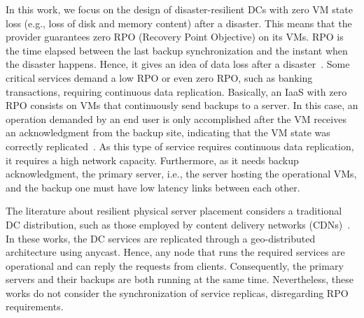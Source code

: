 \documentclass[preprint]{elsarticle}
\begin{document}
In this work, we focus on the design of disaster-resilient DCs with zero VM state loss (e.g., loss of disk and memory content) after a disaster. This means that the provider guarantees zero RPO (Recovery Point Objective) on its VMs. RPO is the time elapsed between the last backup synchronization and the instant when the disaster happens. Hence, it gives an idea of data loss after a disaster~\cite{couto2014Network}. Some critical services demand a low RPO or even zero RPO, such as banking transactions, requiring continuous data replication. 
Basically, an IaaS with zero RPO consists on VMs that continuously send backups to a server. In this case, an operation demanded by an end user is only accomplished after the VM receives an acknowledgment from the backup site, indicating that the VM state was correctly replicated~\cite{rajagopalan2012secondsite}.
As this type of service requires continuous data replication, it requires a high network capacity. Furthermore, as it needs backup acknowledgment, the primary server, i.e., the server hosting the operational VMs, and the backup one must have low latency links between each other.

The literature about resilient physical server placement considers a traditional DC distribution, such as those employed by content delivery networks (CDNs)~\cite{habib2012design,xiaoJoint2014}. In these works, the DC services are replicated through a geo-distributed architecture using anycast.
Hence, any node that runs the required services are operational and can reply the requests from clients. Consequently, the primary servers and their backups are both running at the same time.
Nevertheless, these works do not consider the synchronization of service replicas, disregarding RPO requirements. 
\end{document}
